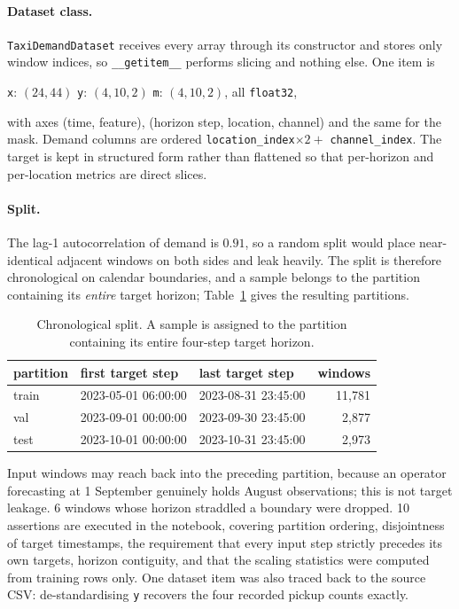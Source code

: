 \documentclass[11pt,a4paper]{article}
\newcommand{\code}[1]{\texttt{#1}}
\begin{document}
\paragraph{Dataset class.} \code{TaxiDemandDataset} receives every array through
its constructor and stores only window indices, so \code{\_\_getitem\_\_} performs
slicing and nothing else. One item is
\begin{center}
\code{x}: $(24, 44)$ \quad
\code{y}: $(4, 10, 2)$ \quad
\code{m}: $(4, 10, 2)$, all \code{float32},
\end{center}
with axes (time, feature), (horizon step, location, channel) and the same for the
mask. Demand columns are ordered \code{location\_index}$\times 2+$
\code{channel\_index}. The target is kept in structured form rather than flattened
so that per-horizon and per-location metrics are direct slices.

\paragraph{Split.} The lag-1 autocorrelation of demand is
$0.91$, so a random split
would place near-identical adjacent windows on both sides and leak heavily. The
split is therefore chronological on calendar boundaries, and a sample belongs to the
partition containing its \emph{entire} target horizon; Table~\ref{tab:p2split}
gives the resulting partitions.

\begin{table}[H]
\centering
\caption{Chronological split. A sample is assigned to the partition containing its entire four-step target horizon.}
\label{tab:p2split}
\begin{tabular}{lllr}
\toprule
partition & first target step & last target step & windows \\
\midrule
train & 2023-05-01 06:00:00 & 2023-08-31 23:45:00 & 11,781 \\
val & 2023-09-01 00:00:00 & 2023-09-30 23:45:00 & 2,877 \\
test & 2023-10-01 00:00:00 & 2023-10-31 23:45:00 & 2,973 \\
\bottomrule
\end{tabular}
\end{table}

Input windows may reach back into the preceding partition, because an operator
forecasting at 1 September genuinely holds August observations; this is not target
leakage. 6 windows whose horizon straddled a
boundary were dropped. 10 assertions are
executed in the notebook, covering partition ordering, disjointness of target
timestamps, the requirement that every input step strictly precedes its own targets,
horizon contiguity, and that the scaling statistics were computed from training rows
only. One dataset item was also traced back to the source CSV: de-standardising
\code{y} recovers the four recorded pickup counts exactly.
\end{document}
